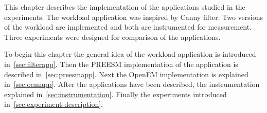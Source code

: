 This chapter describes the implementation of the applications studied in the experiments. The workload application was inspired by Canny filter. Two versions of the workload are implemented and both are instrumented for measurement. Three experiments were designed for comparison of the applications.

To begin this chapter the general idea of the workload application is introduced in~\ref{sec:filterapp}. Then the PREESM implementation of the application is described in~\ref{sec:preesmapp}. Next the OpenEM implementation is explained in~\ref{sec:oemapp}. After the applications have been described, the instrumentation explained in~\ref{sec:instrumentation}. Finally the experiments introduced in~\ref{sec:experiment-description}.
